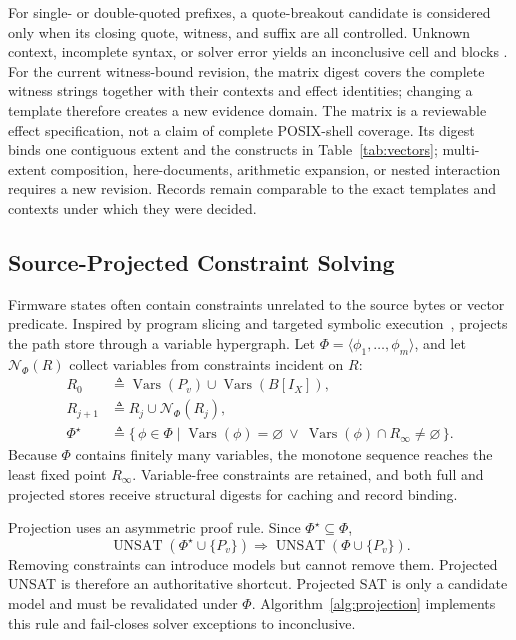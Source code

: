 For single- or double-quoted prefixes, a quote-breakout candidate is considered
only when its closing quote, witness, and suffix are all controlled. Unknown
context, incomplete syntax, or solver error yields an inconclusive cell and
blocks \mfilt. For the current witness-bound revision, the matrix digest covers
the complete witness strings together with their contexts and effect
identities; changing a template therefore creates a new evidence domain. The
matrix is a reviewable effect specification, not a claim of complete POSIX-shell
coverage. Its digest binds one contiguous extent and the
constructs in Table~\ref{tab:vectors}; multi-extent composition, here-documents,
arithmetic expansion, or nested interaction requires a new revision. Records
remain comparable to the exact templates and contexts under which they were
decided.

\subsection{Source-Projected Constraint Solving}
\label{sec:projection}

Firmware states often contain constraints unrelated to the source bytes or
vector predicate. Inspired by program slicing and targeted symbolic execution~\cite{weiser1984,chopped2018}, \tool projects the path store through a variable
hypergraph. Let $\Phi=\langle\phi_1,\ldots,\phi_m\rangle$, and let
$\mathcal{N}_{\Phi}(R)$ collect variables from constraints incident on $R$:
\begin{equation}
\begin{aligned}
R_0&\triangleq \operatorname{Vars}(P_v)
                  \cup\operatorname{Vars}(B[I_X]),\\
R_{j+1}&\triangleq R_j\cup\mathcal{N}_{\Phi}(R_j),\\
\Phi^\star&\triangleq \{\,\phi\in\Phi\mid
  \operatorname{Vars}(\phi)=\varnothing\ \lor\
  \operatorname{Vars}(\phi)\cap R_\infty\neq\varnothing\,\}.
\end{aligned}
\label{eq:projected-store}
\end{equation}
Because $\Phi$ contains finitely many variables, the monotone sequence reaches
the least fixed point $R_\infty$.
Variable-free constraints are retained, and both full and projected stores
receive structural digests for caching and record binding.

Projection uses an asymmetric proof rule. Since $\Phi^\star\subseteq\Phi$,
\begin{equation}
\operatorname{UNSAT}(\Phi^\star\cup\{P_v\})\Rightarrow
\operatorname{UNSAT}(\Phi\cup\{P_v\}).
\label{eq:projection-unsat}
\end{equation}
Removing constraints can introduce models but cannot remove them. Projected
UNSAT is therefore an authoritative shortcut. Projected SAT is only a candidate
model and must be revalidated under $\Phi$. Algorithm~\ref{alg:projection}
implements this rule and fail-closes solver exceptions to inconclusive.

